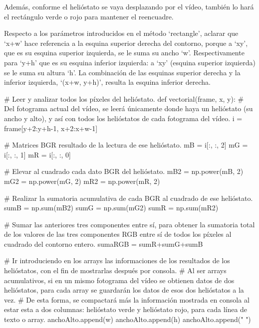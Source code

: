 Además, conforme el helióstato se vaya desplazando por el vídeo, también lo hará el rectángulo verde o rojo para mantener el reencuadre.

Respecto a los parámetros introducidos en el método ‘rectangle’, aclarar que ‘x+w’ hace referencia a la esquina superior derecha del contorno, porque a ‘xy’, que es su esquina superior izquierda, se le suma su ancho ‘w’. Respectivamente para ‘y+h’ que es su esquina inferior izquierda: a ‘xy’ (esquina superior izquierda) se le suma su altura ‘h’. La combinación de las esquinas superior derecha y la inferior izquierda, ‘(x+w, y+h)’, resulta la esquina inferior derecha.


            \# Leer y analizar todos los píxeles del helióstato.
            def vectorial(frame, x, y):
                \# Del fotograma actual del vídeo, se leerá únicamente donde haya un helióstato (su ancho y alto), y así con todos los helióstatos de cada fotograma del vídeo.
                i = frame[y+2:y+h-1, x+2:x+w-1]
                
                \# Matrices BGR resultado de la lectura de ese helióstato.
                mB = i[:, :, 2]
                mG = i[:, :, 1]
                mR = i[:, :, 0]
                                
                \# Elevar al cuadrado cada dato BGR del helióstato.
                mB2 = np.power(mB, 2)
                mG2 = np.power(mG, 2)
                mR2 = np.power(mR, 2)

                \# Realizar la sumatoria acumulativa de cada BGR al cuadrado de ese helióstato.
                sumB = np.sum(mB2)
                sumG = np.sum(mG2)
                sumR = np.sum(mR2)

                \# Sumar las anteriores tres componentes entre sí, para obtener la sumatoria total de los valores de las tres componentes RGB entre sí de todos los píxeles al cuadrado del contorno entero.
                sumaRGB = sumR+sumG+sumB
                
                \# Ir introduciendo en los arrays las informaciones de los resultados de los helióstatos, con el fin de mostrarlas después por consola.
                \# Al ser arrays acumulativos, si en un mismo fotograma del vídeo se obtienen datos de dos helióstatos, para cada array se guardarán los datos de esos dos helióstatos a la vez.
                \# De esta forma, se compactará más la información mostrada en consola al estar esta a dos columnas: helióstato verde y helióstato rojo, para cada línea de texto o array.
                anchoAlto.append(w)
                anchoAlto.append(h)
                anchoAlto.append("                      ")
                
